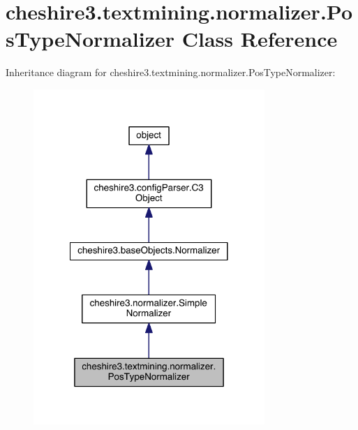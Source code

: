 \hypertarget{classcheshire3_1_1textmining_1_1normalizer_1_1_pos_type_normalizer}{\section{cheshire3.\-textmining.\-normalizer.\-Pos\-Type\-Normalizer Class Reference}
\label{classcheshire3_1_1textmining_1_1normalizer_1_1_pos_type_normalizer}
}


Inheritance diagram for cheshire3.\-textmining.\-normalizer.\-Pos\-Type\-Normalizer\-:
\nopagebreak
\begin{figure}[H]
\begin{center}
\leavevmode
\includegraphics[width=248pt]{classcheshire3_1_1textmining_1_1normalizer_1_1_pos_type_normalizer__inherit__graph}
\end{center}
\end{figure}


